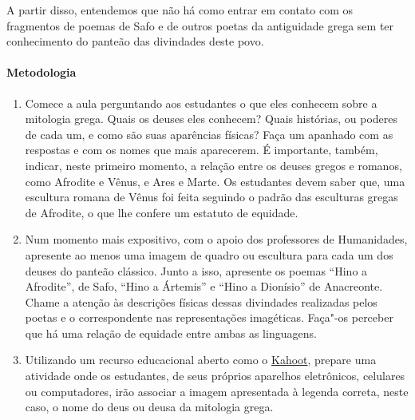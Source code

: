 \documentclass[12pt]{extarticle}
\begin{document}
A partir disso, entendemos que não há como entrar em contato com os fragmentos 
de poemas de Safo e de outros poetas da antiguidade grega sem ter conhecimento 
do panteão das divindades deste povo.


\paragraph{Metodologia}

\begin{enumerate}
\item
Comece a aula perguntando aos estudantes o que eles conhecem sobre 
a mitologia grega. Quais os deuses eles conhecem? Quais histórias,
ou poderes de cada um, e como são suas aparências físicas? Faça um apanhado
com as respostas e com os nomes que mais aparecerem. É importante, também,
indicar, neste primeiro momento, a relação entre os deuses gregos e romanos,
como Afrodite e Vênus, e Ares e Marte. Os estudantes devem saber que, uma escultura
romana de Vênus foi feita seguindo o padrão das esculturas gregas de Afrodite,
o que lhe confere um estatuto de equidade. 

\item
Num momento mais expositivo, com o apoio dos professores de Humanidades, apresente ao menos uma imagem de quadro ou escultura
para cada um dos deuses do panteão clássico.  Junto a isso, apresente os poemas
``Hino a Afrodite'', de Safo, ``Hino a Ártemis'' e ``Hino a Dionísio'' de Anacreonte.
Chame a atenção às descrições físicas dessas divindades realizadas pelos poetas
e o correspondente nas representações imagéticas. Faça"-os perceber que há uma
relação de equidade entre ambas as linguagens. 


\item
Utilizando um recurso educacional aberto como o \href{https://kahoot.com}{Kahoot}, 
prepare uma atividade onde os
estudantes, de seus próprios aparelhos eletrônicos, celulares ou computadores, irão 
associar a imagem apresentada à legenda correta, neste caso, o nome do deus ou deusa 
da mitologia grega.

\end{enumerate}
\end{document}

